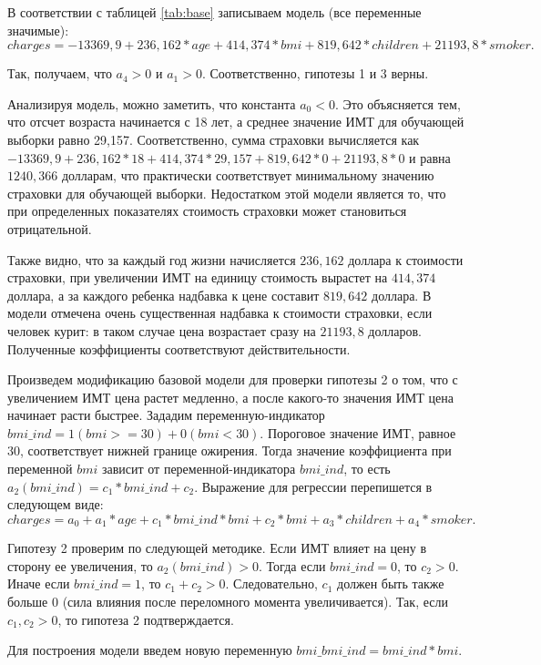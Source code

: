 \documentclass[a4paper,12pt]{article}
\begin{document}
В соответствии с таблицей \ref{tab:base} записываем модель (все переменные значимые):
\[charges = -13369,9 + 236,162 * age + 414,374 * bmi + 819,642 * children + 21193,8 * smoker.\]

Так, получаем, что $a_4 > 0$ и $a_1 > 0$. Соответственно, гипотезы 1 и 3 верны.

Анализируя модель, можно заметить, что константа $a_0 < 0$. Это объясняется тем, что отсчет возраста начинается с 18 лет, а среднее значение ИМТ для обучающей выборки равно 29,157. Соответственно, сумма страховки вычисляется как $-13369,9 + 236,162 * 18 + 414,374 * 29,157 + 819,642 * 0 + 21193,8 * 0$ и равна $1240,366$ долларам, что практически соответствует минимальному значению страховки для обучающей выборки. Недостатком этой модели является то, что при определенных показателях стоимость страховки может становиться отрицательной.

Также видно, что за каждый год жизни начисляется $236,162$ доллара к стоимости страховки, при увеличении ИМТ на единицу стоимость вырастет на $414,374$ доллара, а за каждого ребенка надбавка к цене составит $819,642$ доллара. В модели отмечена очень существенная надбавка к стоимости страховки, если человек курит: в таком случае цена возрастает сразу на $21193,8$ долларов. Полученные коэффициенты соответствуют действительности.

Произведем модификацию базовой модели для проверки гипотезы 2 о том, что с увеличением ИМТ цена растет медленно, а после какого-то значения ИМТ цена начинает расти быстрее. Зададим переменную-индикатор $bmi\_ind = 1 (bmi >= 30) + 0 (bmi < 30)$. Пороговое значение ИМТ, равное 30, соответствует нижней границе ожирения. Тогда значение коэффициента при переменной $bmi$ зависит от переменной-индикатора $bmi\_ind$, то есть $a_2(bmi\_ind) = c_1 * bmi\_ind + c_2$. Выражение для регрессии перепишется в следующем виде:
\[charges = a_0 + a_1 * age + c_1 * bmi\_ind * bmi + c_2 * bmi + a_3 * children + a_4 * smoker.\]

Гипотезу 2 проверим по следующей методике. Если ИМТ влияет на цену в сторону ее увеличения, то $a_2(bmi\_ind) > 0$. Тогда если $bmi\_ind = 0$, то $c_2 > 0$. Иначе если $bmi\_ind = 1$, то $c_1 + c_2 > 0$. Следовательно, $c_1$ должен быть также больше 0 (сила влияния после переломного момента увеличивается). Так, если $c_1, c_2 > 0$, то гипотеза 2 подтверждается.

Для построения модели введем новую переменную $bmi\_bmi\_ind = bmi\_ind * bmi$.
\end{document}
